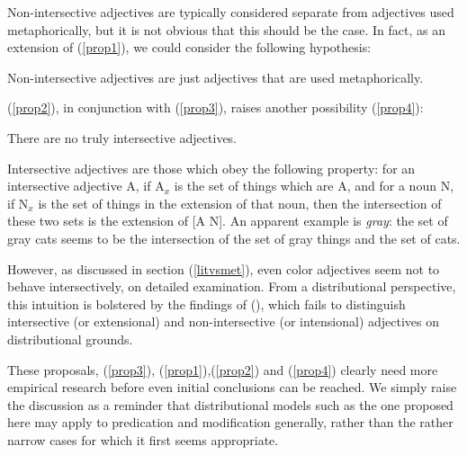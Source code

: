 \documentclass[10pt,letterpaper,twocolumn]{article}
\begin{document}
Non-intersective adjectives are typically considered separate from adjectives used metaphorically, but it is not obvious that this should be the case. In fact, as an extension of (\ref{prop1}), we could consider the following hypothesis:

\begin{exe}
\ex Non-intersective adjectives are just adjectives that are used metaphorically. \label{prop2}
\end{exe}

(\ref{prop2}), in conjunction with (\ref{prop3}), raises another possibility (\ref{prop4}):

\begin{exe}
\ex There are no truly intersective adjectives. \label{prop4}
\end{exe}

Intersective adjectives are those which obey the following property: for an intersective adjective A, if A$_x$ is the set of things which are A, and for a noun N, if N$_x$ is the set of things in the extension of that noun, then the intersection of these two sets is the extension of [A N]. An apparent example is \emph{gray}: the set of gray cats seems to be the intersection of the set of gray things and the set of cats.

However, as discussed in section (\ref{litvsmet}), even color adjectives seem not to behave intersectively, on detailed examination. From a distributional perspective, this intuition is bolstered by the findings of (\cite{boleda}), which fails to distinguish intersective (or extensional) and non-intersective (or intensional) adjectives on distributional grounds.

These proposals, (\ref{prop3}), (\ref{prop1}),(\ref{prop2}) and (\ref{prop4}) clearly need more empirical research before even initial conclusions can be reached. We simply raise the discussion as a reminder that distributional models such as the one proposed here may apply to predication and modification generally, rather than the rather narrow cases for which it first seems appropriate.




\end{document}
